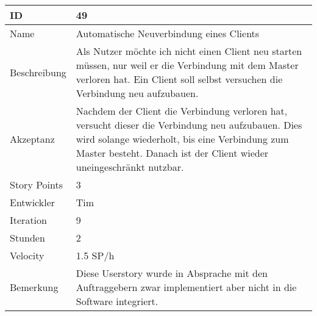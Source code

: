 \begin{table}[htbp]
\begin{minipage}{\linewidth}
\setlength{\tymax}{0.5\linewidth}
\centering
\small
\begin{tabulary}{\textwidth}{|l|p{10cm}|} \hline
 ID   &49\\\hline
Name  &Automatische Neuverbindung eines Clients\\\hline
Beschreibung&Als Nutzer möchte ich nicht einen Client neu starten müssen, nur weil er die Verbindung mit dem Master verloren hat. Ein Client soll selbst versuchen die Verbindung neu aufzubauen.\\\hline
Akzeptanz &Nachdem der Client die Verbindung verloren hat, versucht dieser die Verbindung neu aufzubauen. Dies wird solange wiederholt, bis eine Verbindung zum Master besteht. Danach ist der Client wieder uneingeschränkt nutzbar.\\\hline
Story Points&3\\\hline
Entwickler &Tim\\\hline
Iteration &9\\\hline
Stunden  &2\\\hline
Velocity &1.5 SP\slash h\\\hline
Bemerkung & Diese Userstory wurde in Absprache mit den Auftraggebern zwar implementiert aber nicht in die Software integriert.\\\hline
\end{tabulary}
\end{minipage}
\end{table}

